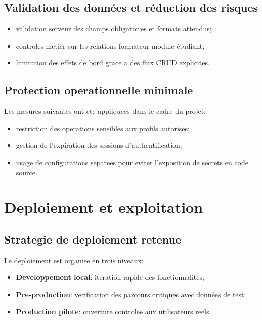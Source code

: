 \documentclass[12pt,a4paper,oneside]{report}
\begin{document}
\subsection{Validation des données et réduction des risques}

\begin{itemize}
  \item validation serveur des champs obligatoires et formats attendus;
  \item controles metier sur les relations formateur-module-étudiant;
  \item limitation des effets de bord grace a des flux CRUD explicites.
\end{itemize}

\subsection{Protection operationnelle minimale}

Les mesures suivantes ont ete appliquees dans le cadre du projet:
\begin{itemize}
  \item restriction des operations sensibles aux profils autorises;
  \item gestion de l'expiration des sessions d'authentification;
  \item usage de configurations separees pour eviter l'exposition de secrets en code source.
\end{itemize}

\section{Deploiement et exploitation}

\subsection{Strategie de deploiement retenue}

Le deploiement est organise en trois niveaux:
\begin{itemize}
  \item \textbf{Developpement local}: iteration rapide des fonctionnalites;
  \item \textbf{Pre-production}: verification des parcours critiques avec données de test;
  \item \textbf{Production pilote}: ouverture controlee aux utilisateurs reels.
\end{itemize}
\end{document}

